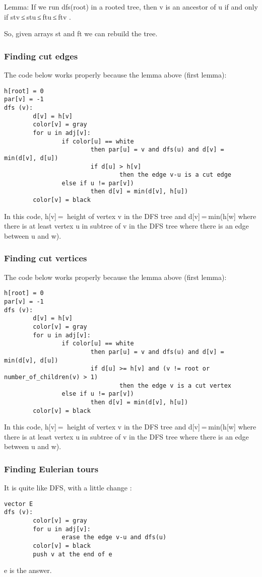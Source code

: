 Lemma: If we run dfs(root) in a rooted tree, then v is an ancestor of u if and only if stv ≤ stu ≤ ftu ≤ ftv .

So, given arrays st and ft we can rebuild the tree.
\subsubsection{Finding cut edges}
The code below works properly because the lemma above (first lemma):
\begin{verbatim}
h[root] = 0
par[v] = -1
dfs (v):
        d[v] = h[v]
        color[v] = gray
        for u in adj[v]:
                if color[u] == white
                        then par[u] = v and dfs(u) and d[v] = min(d[v], d[u])
                        if d[u] > h[v]
                                then the edge v-u is a cut edge
                else if u != par[v])
                        then d[v] = min(d[v], h[u])
        color[v] = black
\end{verbatim}
In this code, h[v] =  height of vertex v in the DFS tree and d[v] = min(h[w] where there is at least vertex u in subtree of v in the DFS tree where there is an edge between u and w).
\subsubsection{Finding cut vertices}
The code below works properly because the lemma above (first lemma):
\begin{verbatim}
h[root] = 0
par[v] = -1
dfs (v):
        d[v] = h[v]
        color[v] = gray
        for u in adj[v]:
                if color[u] == white
                        then par[u] = v and dfs(u) and d[v] = min(d[v], d[u])
                        if d[u] >= h[v] and (v != root or number_of_children(v) > 1)
                                then the edge v is a cut vertex
                else if u != par[v])
                        then d[v] = min(d[v], h[u])
        color[v] = black
\end{verbatim}
In this code, h[v] =  height of vertex v in the DFS tree and d[v] = min(h[w] where there is at least vertex u in subtree of v in the DFS tree where there is an edge between u and w).
\subsubsection{Finding Eulerian tours}
It is quite like DFS, with a little change :
\begin{verbatim}
vector E
dfs (v):
        color[v] = gray
        for u in adj[v]:
                erase the edge v-u and dfs(u)
        color[v] = black
        push v at the end of e
\end{verbatim}
e is the answer.
